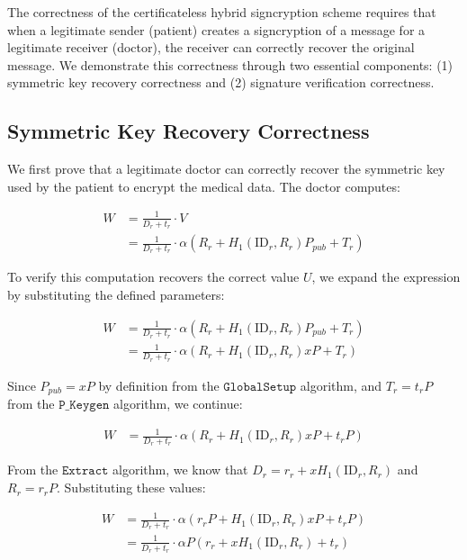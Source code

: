 \documentclass[10pt]{article}
\begin{document}
The correctness of the certificateless hybrid signcryption scheme requires that when a legitimate sender (patient) creates a signcryption of a message for a legitimate receiver (doctor), the receiver can correctly recover the original message. We demonstrate this correctness through two essential components: (1) symmetric key recovery correctness and (2) signature verification correctness.

\subsection{Symmetric Key Recovery Correctness}

We first prove that a legitimate doctor can correctly recover the symmetric key used by the patient to encrypt the medical data. The doctor computes:

\begin{align}
W &= \frac{1}{D_r + t_r} \cdot V\\
&= \frac{1}{D_r + t_r} \cdot \alpha(R_r + H_1(\text{ID}_r,R_r)P_{pub} + T_r)
\end{align}

To verify this computation recovers the correct value $U$, we expand the expression by substituting the defined parameters:

\begin{align}
W &= \frac{1}{D_r + t_r} \cdot \alpha(R_r + H_1(\text{ID}_r,R_r)P_{pub} + T_r)\\
&= \frac{1}{D_r + t_r} \cdot \alpha(R_r + H_1(\text{ID}_r,R_r)xP + T_r)
\end{align}

Since $P_{pub} = xP$ by definition from the $\texttt{GlobalSetup}$ algorithm, and $T_r = t_r P$ from the $\texttt{P\_Keygen}$ algorithm, we continue:

\begin{align}
W &= \frac{1}{D_r + t_r} \cdot \alpha(R_r + H_1(\text{ID}_r,R_r)xP + t_r P)
\end{align}

From the $\texttt{Extract}$ algorithm, we know that $D_r = r_r + xH_1(\text{ID}_r,R_r)$ and $R_r = r_r P$. Substituting these values:

\begin{align}
W &= \frac{1}{D_r + t_r} \cdot \alpha(r_r P + H_1(\text{ID}_r,R_r)xP + t_r P)\\
&= \frac{1}{D_r + t_r} \cdot \alpha P(r_r + xH_1(\text{ID}_r,R_r) + t_r)
\end{align}
\end{document}

